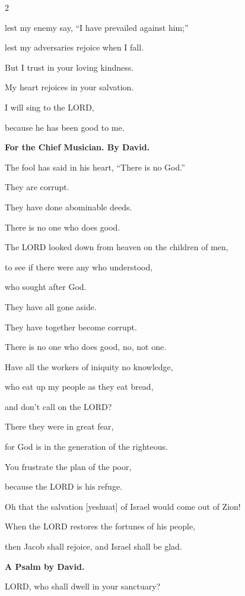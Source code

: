 \begin{multicols}{2}
	
	\myverse{}lest my enemy say, “I have prevailed against him;”
	
	lest my adversaries rejoice when I fall.
	
	\vspace{\baselineskip}
	
	\myverse{}But I trust in your loving kindness.
	
	My heart rejoices in your salvation.
	
	
	\myverse{}I will sing to the LORD,
	
	because he has been good to me.
	
	
	\mychapter{}\textbf{For the Chief Musician. By David.}
	
	\quad \myverse*{}The fool has said in his heart, “There is no God.”
	
	They are corrupt.
	
	They have done abominable deeds.
	
	There is no one who does good.
	
	
	\myverse{}The LORD looked down from heaven on the children of men,
	
	to see if there were any who understood,
	
	who sought after God.
	
	
	\myverse{}They have all gone aside.
	
	They have together become corrupt.
	
	There is no one who does good, no, not one.
	
	
	\myverse{}Have all the workers of iniquity no knowledge,
	
	who eat up my people as they eat bread,
	
	and don’t call on the LORD?
	
	
	\myverse{}There they were in great fear,
	
	for God is in the generation of the righteous.
	
	
	\myverse{}You frustrate the plan of the poor,
	
	because the LORD is his refuge.
	
	
	\myverse{}Oh that the salvation [yeshuat] of Israel would come out of Zion!
	
	When the LORD restores the fortunes of his people,
	
	then Jacob shall rejoice, and Israel shall be glad.
	
	
	\mychapter{}\textbf{A Psalm by David.}
	
	\quad \myverse*{}LORD, who shall dwell in your sanctuary?
	

\end{multicols}
